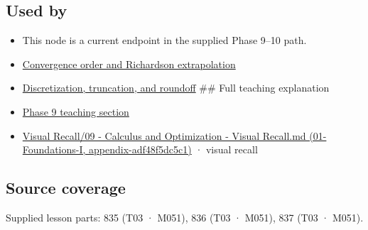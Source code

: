 \subsection{Used by}\label{appendix-80521eae6b71-used-by}

\begin{itemize}
\item
  This node is a current endpoint in the supplied Phase 9--10 path.
\item
  \hyperref[appendix-aca80b6bf17a]{Convergence order and Richardson extrapolation}
\item
  \hyperref[appendix-6b0648b2b8e8]{Discretization, truncation, and roundoff} \#\# Full teaching explanation
\item
  \hyperref[02-foundations-ii-ch022-integration-and-quadrature]{Phase 9 teaching section}
\item
  \href{../01-Foundations-I/main.pdf\#nameddest=appendix-adf48f5dc5c1}{Visual Recall/09 - Calculus and Optimization - Visual Recall.md (01-Foundations-I, appendix-adf48f5dc5c1)} · visual recall
\end{itemize}

\subsection{Source coverage}\label{appendix-80521eae6b71-source-coverage}

Supplied lesson parts: 835 (T03 · M051), 836 (T03 · M051), 837 (T03 · M051).
